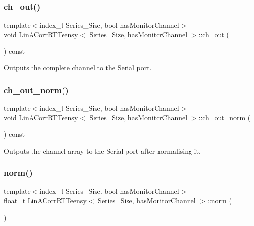 \subsubsection{\texorpdfstring{ch\+\_\+out()}{ch\_out()}}
{\footnotesize\ttfamily template$<$index\+\_\+t Series\+\_\+\+Size, bool has\+Monitor\+Channel$>$ \\
void \hyperlink{classLinACorrRTTeensy}{Lin\+A\+Corr\+R\+T\+Teensy}$<$ Series\+\_\+\+Size, has\+Monitor\+Channel $>$\+::ch\+\_\+out (\begin{DoxyParamCaption}{ }\end{DoxyParamCaption}) const\hspace{0.3cm}{\ttfamily [inline]}}



Outputs the complete channel to the Serial port. 

\mbox{\label{classLinACorrRTTeensy_a4d1be65472a058b056386286d093b847}} 
\subsubsection{\texorpdfstring{ch\+\_\+out\+\_\+norm()}{ch\_out\_norm()}}
{\footnotesize\ttfamily template$<$index\+\_\+t Series\+\_\+\+Size, bool has\+Monitor\+Channel$>$ \\
void \hyperlink{classLinACorrRTTeensy}{Lin\+A\+Corr\+R\+T\+Teensy}$<$ Series\+\_\+\+Size, has\+Monitor\+Channel $>$\+::ch\+\_\+out\+\_\+norm (\begin{DoxyParamCaption}{ }\end{DoxyParamCaption}) const\hspace{0.3cm}{\ttfamily [inline]}}



Outputs the channel array to the Serial port after normalising it. 

\mbox{\label{classLinACorrRTTeensy_a98110e3b97a2300b9078a6e57a8234bc}} 
\subsubsection{\texorpdfstring{norm()}{norm()}}
{\footnotesize\ttfamily template$<$index\+\_\+t Series\+\_\+\+Size, bool has\+Monitor\+Channel$>$ \\
float\+\_\+t \hyperlink{classLinACorrRTTeensy}{Lin\+A\+Corr\+R\+T\+Teensy}$<$ Series\+\_\+\+Size, has\+Monitor\+Channel $>$\+::norm (\begin{DoxyParamCaption}{ }\end{DoxyParamCaption})\hspace{0.3cm}{\ttfamily [inline]}}



